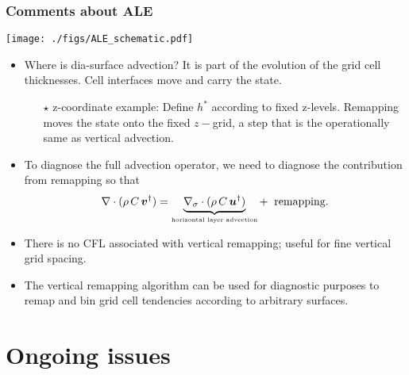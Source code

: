 \documentclass[10pt]{beamer}
\begin{document}
\begin{frame}
  \frametitle{Comments about ALE}

\begin{center}
{\texttt{[image: ./figs/ALE\_schematic.pdf]}}
\end{center}


\vspace{-.3cm} 
\begin{exampleblock}{}
\begin{itemize}


\item {\sc Where is dia-surface advection?}  It is part of the
  evolution of the grid cell thicknesses.  Cell interfaces move and
  carry the state.
   \begin{itemize}  \footnotesize 
   \item[$\star$] {\sc z-coordinate example:} Define $h^{*}$ according
     to fixed z-levels.  Remapping moves the state onto the fixed
     $z-$grid, a step that is the operationally same as vertical
     advection.
   \end{itemize}

 \item To diagnose the full advection operator, we need to diagnose
   the contribution from remapping so that
\begin{equation}
    \nabla \cdot (\rho \, C \, {\bm v}^{\dagger} ) = \underbrace{ \nabla_{\sigma} \cdot (\rho \, C \, {\bm u}^{\dagger} )}_{\mbox{\tiny horizontal layer advection}}
  + \; \; \mbox{remapping}.
\end{equation}

\item There is no CFL associated with vertical remapping; useful for
  fine vertical grid spacing.

\item The vertical remapping algorithm can be used for diagnostic
  purposes to remap and bin grid cell tendencies according to
  arbitrary surfaces.

\end{itemize}
\end{exampleblock}{}

\end{frame}













\section{Ongoing issues}
\end{document}
